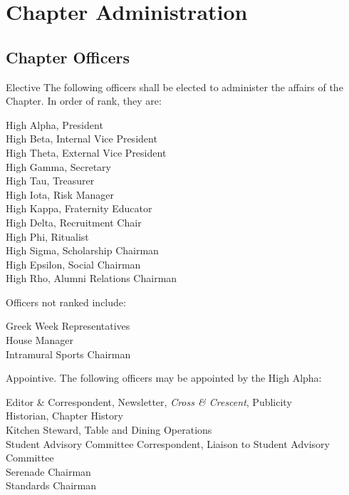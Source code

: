 \documentclass{article}
\begin{document}
\pagebreak

\section{Chapter Administration}

\subsection{Chapter Officers}

\begin{subsubsectionList}
  \item {\titleStyle Elective\titleSuffix}
  The following officers shall be elected to administer the affairs of the
  Chapter. In order of rank, they are:
  \vspace*{-\parskip}
  \begin{adjustwidth}{}{}
  High Alpha, President\\
  High Beta, Internal Vice President\\
  High Theta, External Vice President\\
  High Gamma, Secretary\\
  High Tau, Treasurer\\
  High Iota, Risk Manager\\
  High Kappa, Fraternity Educator\\
  High Delta, Recruitment Chair\\
  High Phi, Ritualist\\
  High Sigma, Scholarship Chairman\\
  High Epsilon, Social Chairman\\
  High Rho, Alumni Relations Chairman
  \end{adjustwidth}

  Officers not ranked include:
  \vspace*{-\parskip}
  \begin{adjustwidth}{}{}
  Greek Week Representatives\\
  House Manager\\
  Intramural Sports Chairman
  \end{adjustwidth}

  \item {\titleStyle Appointive.}
  The following officers may be appointed by the High Alpha:

  \begin{adjustwidth}{}{}
  Editor \& Correspondent, Newsletter, \emph{Cross \& Crescent}, Publicity\\
  Historian, Chapter History\\
  Kitchen Steward, Table and Dining Operations\\
  Student Advisory Committee Correspondent, Liaison to Student Advisory
  Committee\\
  Serenade Chairman\\
  Standards Chairman
  \end{adjustwidth}
\end{subsubsectionList}
\end{document}
